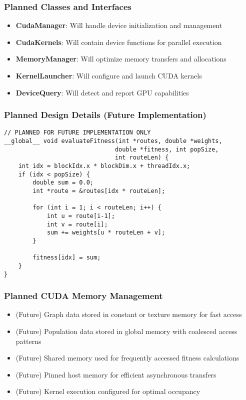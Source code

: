 \documentclass[conference]{IEEEtran}
\begin{document}
\subsubsection{Planned Classes and Interfaces}
\begin{itemize}
    \item \textbf{CudaManager}: Will handle device initialization and management
    \item \textbf{CudaKernels}: Will contain device functions for parallel execution
    \item \textbf{MemoryManager}: Will optimize memory transfers and allocations
    \item \textbf{KernelLauncher}: Will configure and launch CUDA kernels
    \item \textbf{DeviceQuery}: Will detect and report GPU capabilities
\end{itemize}

\subsubsection{Planned Design Details (Future Implementation)}
\begin{lstlisting}[caption=Example Future CUDA Kernel for Fitness Evaluation]
// PLANNED FOR FUTURE IMPLEMENTATION ONLY
__global__ void evaluateFitness(int *routes, double *weights,
                               double *fitness, int popSize,
                               int routeLen) {
    int idx = blockIdx.x * blockDim.x + threadIdx.x;
    if (idx < popSize) {
        double sum = 0.0;
        int *route = &routes[idx * routeLen];

        for (int i = 1; i < routeLen; i++) {
            int u = route[i-1];
            int v = route[i];
            sum += weights[u * routeLen + v];
        }

        fitness[idx] = sum;
    }
}
\end{lstlisting}

\subsubsection{Planned CUDA Memory Management}
\begin{itemize}
    \item (Future) Graph data stored in constant or texture memory for fast access
    \item (Future) Population data stored in global memory with coalesced access patterns
    \item (Future) Shared memory used for frequently accessed fitness calculations
    \item (Future) Pinned host memory for efficient asynchronous transfers
    \item (Future) Kernel execution configured for optimal occupancy
\end{itemize}
\end{document}
